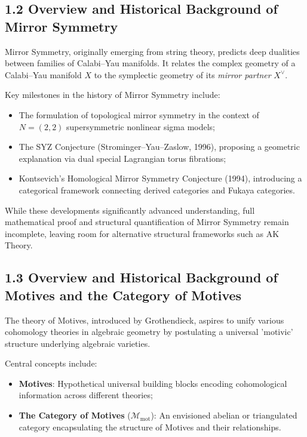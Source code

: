 \documentclass[11pt]{article}
\begin{document}
\subsection{1.2 Overview and Historical Background of Mirror Symmetry}

Mirror Symmetry, originally emerging from string theory, predicts deep dualities between families of Calabi--Yau manifolds. It relates the complex geometry of a Calabi--Yau manifold $X$ to the symplectic geometry of its \textit{mirror partner} $X^{\vee}$.

Key milestones in the history of Mirror Symmetry include:

\begin{itemize}
    \item The formulation of topological mirror symmetry in the context of $N=(2,2)$ supersymmetric nonlinear sigma models;
    \item The SYZ Conjecture (Strominger--Yau--Zaslow, 1996), proposing a geometric explanation via dual special Lagrangian torus fibrations;
    \item Kontsevich's Homological Mirror Symmetry Conjecture (1994), introducing a categorical framework connecting derived categories and Fukaya categories.
\end{itemize}

While these developments significantly advanced understanding, full mathematical proof and structural quantification of Mirror Symmetry remain incomplete, leaving room for alternative structural frameworks such as AK Theory.

\subsection{1.3 Overview and Historical Background of Motives and the Category of Motives}

The theory of Motives, introduced by Grothendieck, aspires to unify various cohomology theories in algebraic geometry by postulating a universal 'motivic' structure underlying algebraic varieties.

Central concepts include:

\begin{itemize}
    \item \textbf{Motives}: Hypothetical universal building blocks encoding cohomological information across different theories;
    \item \textbf{The Category of Motives} ($\mathcal{M}_{\mathrm{mot}}$): An envisioned abelian or triangulated category encapsulating the structure of Motives and their relationships.
\end{itemize}
\end{document}
